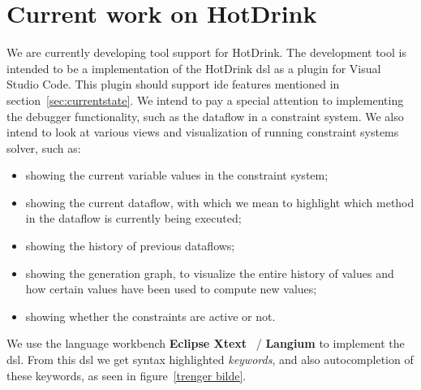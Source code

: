 \section{Current work on HotDrink}
We are currently developing tool support for HotDrink. The development tool is intended 
to be a implementation of the HotDrink \gls{dsl} as a plugin for Visual Studio Code. 
This plugin should support \gls{ide} features mentioned in section~\ref{sec:currentstate}. 
We intend to pay a special attention to implementing the debugger functionality, such as 
the dataflow in a constraint system. We also intend to look at various views and 
visualization of running constraint systems solver, such as: 
\begin{itemize}
    \item showing the current variable values in the constraint system;
    \item showing the current dataflow, with which we mean to highlight which method in the dataflow is currently being executed;
    \item showing the history of previous dataflows;
    \item showing the generation graph, to visualize the entire history of values and how certain values have been used to compute new values;
    \item showing whether the constraints are active or not.
\end{itemize}

We use the language workbench \textbf{Eclipse Xtext}~\cite{eysholdt_xtext:_2010} / 
\textbf{Langium} to implement the \gls{dsl}. From this \gls{dsl} we get syntax 
highlighted \textit{keywords}, and also autocompletion of these keywords, as seen in figure~\ref{trenger bilde}. 
